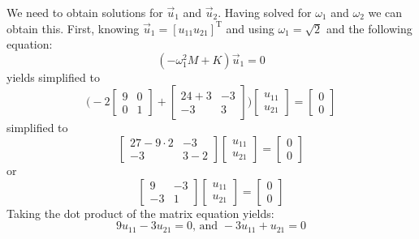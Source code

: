 \documentclass[12pt,letter]{article}
\begin{document}
\begin{example}
	We need to obtain solutions for $\vec{u}_1$ and $\vec{u}_2$. Having solved for $\omega_1$ and $\omega_2$ we can obtain this. First, knowing $\vec{u}_1 = [u_{11} u_{21}]^\text{T}$ and using $\omega_1 = \sqrt{2}$ and the following equation:
	\begin{equation}
		(-\omega_1^2 M  + K)\vec{u}_1 =0
	\end{equation}
	yields
	simplified to
	\begin{equation}
		 \bigg(-2\begin{bmatrix} 9 & 0 \\   0  & 1 \end{bmatrix} + \begin{bmatrix} 24+3 & -3 \\    -3  & 3 \end{bmatrix}\bigg)\begin{bmatrix} u_{11}\\ u_{21}\end{bmatrix} = \begin{bmatrix} 0\\ 0\end{bmatrix}
	\end{equation}
	simplified to
	\begin{equation}
		 \begin{bmatrix} 27-9\cdot 2 & -3 \\    -3  & 3-2 \end{bmatrix} 
		 \begin{bmatrix} u_{11}\\ u_{21}\end{bmatrix}=\begin{bmatrix} 0\\ 0\end{bmatrix}
	\end{equation}
	or
	\begin{equation}
		 \begin{bmatrix} 9 & -3 \\    -3  & 1 \end{bmatrix} 
		 \begin{bmatrix} u_{11}\\ u_{21}\end{bmatrix}=\begin{bmatrix} 0\\ 0\end{bmatrix}
	\end{equation}
	Taking the dot product of the matrix equation yields:
	\begin{equation}
		9u_{11} -3u_{21}=0 \text{, and } -3u_{11} + u_{21}=0

\end{equation}
\end{example}
\end{document}
